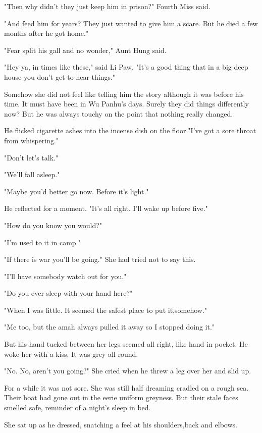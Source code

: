 \par "Then why didn't they just keep him in prison?" Fourth Miss said.
\par "And feed him for years? They just wanted to give him a scare. But he died a few months after he got home."
\par "Fear split his gall and no wonder," Aunt Hung said.
\par "Hey ya, in times like these," said Li Paw, "It's a good thing that in a big deep house you don't get to hear things."
\par Somehow she did not feel like telling him the story although it was before his time. It must have been in Wu Panhu's days. Surely they did things differently now? But he was always touchy on the point that nothing really changed.
\par He flicked cigarette ashes into the incense dish on the floor."I've got a sore throat from whispering."
\par "Don't let's talk."
\par "We'll fall asleep."
\par "Maybe you'd better go now. Before it's light."
\par He reflected for a moment. "It's all right. I'll wake up before five."
\par "How do you know you would?"
\par "I'm used to it in camp."
\par "If there is war you'll be going." She had tried not to say this.
\par "I'll have somebody watch out for you."
\par "Do you ever sleep with your hand here?"
\par "When I was little. It seemed the safest place to put it,somehow."
\par "Me too, but the amah always pulled it away so I stopped doing it."
\par But his hand tucked between her legs seemed all right, like hand in pocket. He woke her with a kiss. It was grey all round.
\par "No. No, aren't you going?" She cried when he threw a leg over her and slid up.
\par For a while it was not sore. She was still half dreaming cradled on a rough sea. Their boat had gone out in the eerie uniform greyness. But their stale faces smelled safe, reminder of a night's sleep in bed.
\par She sat up as he dressed, snatching a feel at his shoulders,back and elbows.
